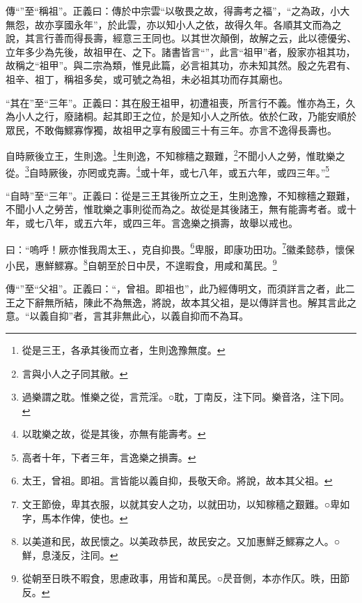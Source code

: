{\noindent\zhuan{}\fzbyks 傳“”至“稱祖”。正義曰：傳於中宗雲“以敬畏之故，得壽考之福”，“之為政，小大無怨，故亦享國永年”，於此雲，亦以知小人之依，故得久年。各順其文而為之說，其言行善而得長壽，經意三王同也。以其世次顛倒，故解之云，此以德優劣、立年多少為先後，故祖甲在、之下。諸書皆言“”，此言“祖甲”者，殷家亦祖其功，故稱之“祖甲”。與二宗為類，惟見此篇，必言祖其功，亦未知其然。殷之先君有、祖辛、祖丁，稱祖多矣，或可號之為祖，未必祖其功而存其廟也。 \par}

{\noindent\shu{}\fzkt “其在”至“三年”。正義曰：其在殷王祖甲，初遭祖喪，所言行不義。惟亦為王，久為小人之行，廢諸桐。起其即王之位，於是知小人之所依。依於仁政，乃能安順於眾民，不敢侮鰥寡惸獨，故祖甲之享有殷國三十有三年。亦言不逸得長壽也。 \par}

自時厥後立王，生則逸。\footnote{從是三王，各承其後而立者，生則逸豫無度。}生則逸，不知稼穡之艱難，\footnote{言與小人之子同其敝。}不聞小人之勞，惟耽樂之從。\footnote{過樂謂之耽。惟樂之從，言荒淫。○耽，丁南反，注下同。樂音洛，注下同。}自時厥後，亦罔或克壽。\footnote{以耽樂之故，從是其後，亦無有能壽考。}或十年，或七八年，或五六年，或四三年。”\footnote{高者十年，下者三年，言逸樂之損壽。}

{\noindent\shu{}\fzkt “自時”至“三年”。正義曰：從是三王其後所立之王，生則逸豫，不知稼穡之艱難，不聞小人之勞苦，惟耽樂之事則從而為之。故從是其後諸王，無有能壽考者。或十年，或七八年，或五六年，或四三年。言逸樂之損壽，故舉以戒也。 \par}

曰：“嗚呼！厥亦惟我周太王、，克自抑畏。\footnote{太王，曾祖。即祖。言皆能以義自抑，長敬天命。將說，故本其父祖。}卑服，即康功田功。\footnote{文王節儉，卑其衣服，以就其安人之功，以就田功，以知稼穡之艱難。○卑如字，馬本作俾，使也。}徽柔懿恭，懷保小民，惠鮮鰥寡。\footnote{以美道和民，故民懷之。以美政恭民，故民安之。又加惠鮮乏鰥寡之人。○鮮，息淺反，注同。}自朝至於日中昃，不遑暇食，用咸和萬民。\footnote{從朝至日昳不暇食，思慮政事，用皆和萬民。○昃音側，本亦作仄。昳，田節反。}


{\noindent\zhuan{}\fzbyks 傳“”至“父祖”。正義曰：“，曾祖。即祖也”，此乃經傳明文，而須詳言之者，此二王之下辭無所結，陳此不為無逸，將說，故本其父祖，是以傳詳言也。解其言此之意。“以義自抑”者，言其非無此心，以義自抑而不為耳。 \par}

